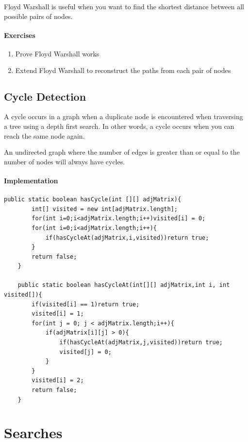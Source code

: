 \documentclass[11pt,oneside]{book}
\begin{document}
Floyd Warshall is useful when you want to find the shortest distance between all possible pairs of nodes.

\subsection{Exercises}

\begin{enumerate}
\item Prove Floyd Warshall works
\item Extend Floyd Warshall to reconstruct the paths from each pair of nodes
\end{enumerate}

    \chapter{ Cycle Detection }
    

A cycle occurs in a graph when a duplicate node is encountered when traversing a tree using a depth first search. In other words, a cycle occurs when you can reach the same node again.

An undirected graph where the number of edges is greater than or equal to the number of nodes will always have cycles.

\subsection{Implementation}

\begin{lstlisting}
public static boolean hasCycle(int [][] adjMatrix){
        int[] visited = new int[adjMatrix.length];
        for(int i=0;i<adjMatrix.length;i++)visited[i] = 0;
        for(int i=0;i<adjMatrix.length;i++){
            if(hasCycleAt(adjMatrix,i,visited))return true;
        }
        return false;
    }
    
    public static boolean hasCycleAt(int[][] adjMatrix,int i, int visited[]){
        if(visited[i] == 1)return true;
        visited[i] = 1;
        for(int j = 0; j < adjMatrix.length;i++){
            if(adjMatrix[i][j] > 0){
                if(hasCycleAt(adjMatrix,j,visited))return true;
                visited[j] = 0;
            }
        }
        visited[i] = 2;
        return false;
    }
\end{lstlisting}

\part{ Searches }
\end{document}

